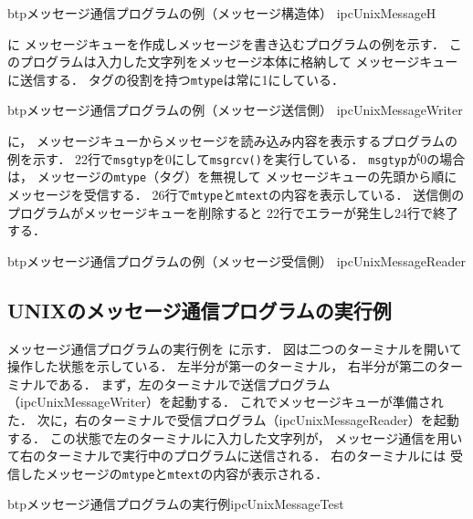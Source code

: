 \begin{myfig}{btp}{メッセージ通信プログラムの例（メッセージ構造体）}
{ipcUnixMessageH}

\end{myfig}

に
メッセージキューを作成しメッセージを書き込むプログラムの例を示す．
このプログラムは入力した文字列をメッセージ本体に格納して
メッセージキューに送信する．
タグの役割を持つ{\tt mtype}は常に1にしている．

\begin{myfig}{btp}{メッセージ通信プログラムの例（メッセージ送信側）}
{ipcUnixMessageWriter}

\end{myfig}

に，
メッセージキューからメッセージを読み込み内容を表示するプログラムの例を示す．
22行で{\tt msgtyp}を0にして{\tt msgrcv()}を実行している．
{\tt msgtyp}が0の場合は，
メッセージの{\tt mtype}（タグ）を無視して
メッセージキューの先頭から順にメッセージを受信する．
26行で{\tt mtype}と{\tt mtext}の内容を表示している．
送信側のプログラムがメッセージキューを削除すると
22行でエラーが発生し24行で終了する．

\begin{myfig}{btp}{メッセージ通信プログラムの例（メッセージ受信側）}
{ipcUnixMessageReader}

\end{myfig}

\subsection{UNIXのメッセージ通信プログラムの実行例}
メッセージ通信プログラムの実行例を
に示す．
図は二つのターミナルを開いて操作した状態を示している．
左半分が第一のターミナル，
右半分が第二のターミナルである．
まず，左のターミナルで送信プログラム（ipcUnixMessageWriter）を起動する．
これでメッセージキューが準備された．
次に，右のターミナルで受信プログラム（ipcUnixMessageReader）を起動する．
この状態で左のターミナルに入力した文字列が，
メッセージ通信を用いて右のターミナルで実行中のプログラムに送信される．
右のターミナルには
受信したメッセージの{\tt mtype}と{\tt mtext}の内容が表示される．

\begin{myfig}{btp}{メッセージ通信プログラムの実行例}{ipcUnixMessageTest}

\end{myfig}

